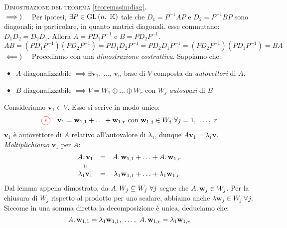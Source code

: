 \begin{demonstration} \textsc{Dimostrazione del teorema} \ref{teoremasimdiag}.\\
	$\implies)\quad$ Per ipotesi, $\exists P\in \operatorname{GL}\left(n,\ \mathbb{K}\right)$ tale che $D_1=P^{-1}AP$ e $D_2=P^{-1}BP$ sono diagonali; in particolare, in quanto matrici diagonali, esse commutano: $D_1D_2=D_2D_1$. Allora $A=PD_1P^{-1}$ e $B=PD_2P^{-1}$.
	\begin{equation*}
		AB=\left(PD_1P^{-1}\right)\left(PD_2P^{-1}\right)=PD_1D_2P^{-1}=PD_2D_1P^{-1}=\left(PD_2P^{-1}\right)\left(PD_1P^{-1}\right)=BA
	\end{equation*}
$\impliedby)\quad$ Procediamo con una \textit{dimostrazione costruttiva}. Sappiamo che:
\begin{itemize}
	\item $A$ diagonalizzabile $\implies \exists \mathbf{v}_1,\ \ldots,\ \mathbf{v}_n$ base di $V$ composta da \textit{autovettori} di $A$.
	\item $B$ diagonalizzabile $\implies V=W_1\oplus\ldots\oplus W_r$ con $W_j$ \textit{autospazi} di $B$
\end{itemize}
Consideriamo $\mathbf{v}_1\in V$. Esso si scrive in modo unico:
\begin{equation*}
	\textcolor{red}{\circled{{\ast}}}\quad \mathbf{v}_1=\mathbf{w}_{1,1}+\ldots+\mathbf{w}_{1,r}\text{ con }\mathbf{w}_{1,j}\in W_j\ \forall j=1,\ \ldots,\ r
\end{equation*}
$\mathbf{v}_1$ è autovettore di $A$ relativo all'autovalore di $\lambda_1$, dunque $A\mathbf{v}_1=\lambda_1\mathbf{v}$. \textit{Moltiplichiamo} $\mathbf{v}_1$ per $A$:
\begin{equation*}
	\begin{array}{ccc}
		A\ldotp\mathbf{v}_1&=&A\ldotp\mathbf{w}_{1,1}+\ldots+A\ldotp\mathbf{w}_{1,r}\\
		\shortparallel&\\
		\lambda_1\mathbf{v}_1&=&\lambda_1\mathbf{w}_{1,1}+\ldots+\lambda_1\mathbf{w}_{1,r}
	\end{array}
\end{equation*}
Dal lemma appena dimostrato, da $A\ldotp W_j\subseteq W_j\ \forall j$ segue che $A\ldotp \mathbf{w}_j\in W_j$. Per la chiusura di $W_j$ rispetto al prodotto per uno scalare, abbiamo anche $\lambda \mathbf{w}_j\in W_j\ \forall j$. Siccome in una somma diretta la decomposizione è unica, deduciamo che:
\begin{equation*}
	A\ldotp \mathbf{w}_{1,1}=\lambda_1 \mathbf{w}_{1,1},\ \ldots,\ A\ldotp \mathbf{w}_{1,r}=\lambda_1 \mathbf{w}_{1,r}

\end{equation*}
\end{demonstration}
